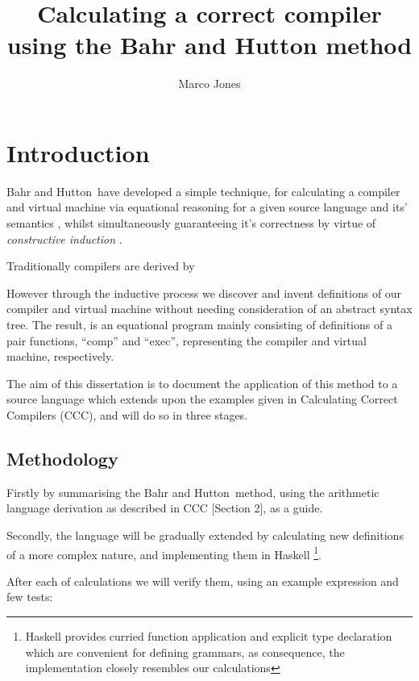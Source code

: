 \documentclass {article}
\title{Calculating a correct compiler using the Bahr and Hutton method}
\author{Marco Jones}
\date{}
\begin{document}
\maketitle

\tableofcontents

\newcommand{\BH}{Bahr and Hutton}
\newcommand{\vm}{virtual machine}

\section{Introduction}
\BH\ have developed a simple technique, for
calculating a compiler and virtual machine via equational reasoning
for a given source language and its' semantics \cite{bandh}, 
whilst simultaneously guaranteeing it's correctness by virtue 
of \emph{constructive induction} \cite{backhouse}.

Traditionally compilers are derived by %

However through the inductive process we discover and invent definitions
of our compiler and virtual machine without needing consideration of an 
abstract syntax tree.
The result, is an equational program mainly consisting of
definitions of a pair functions,  ``comp'' and ``exec'',
representing the compiler and virtual machine, respectively.

The aim of this dissertation is to document the
application of this method
to a source language which extends upon the examples given in
Calculating Correct Compilers (CCC),
and will do so in three stages.

\subsection{Methodology}

Firstly by summarising the \BH\ method,
using the arithmetic language derivation as described in
CCC [Section 2], as a guide.

Secondly, the language will be gradually extended
by calculating new definitions of a more complex nature,
and implementing them in Haskell
\footnote{Haskell provides curried function application
		and explicit type declaration which are
		convenient for defining grammars,
		as consequence, the implementation closely
		resembles our calculations}.

After each of calculations we will verify
them, using an example expression
and few tests:
\end{document}
